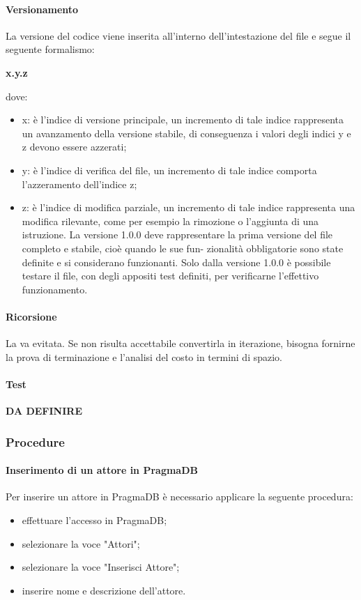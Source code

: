  \paragraph{Versionamento}
 La versione del codice viene inserita all’interno dell’intestazione del file e segue il seguente formalismo:\\
 \centerline{\textbf{x.y.z}} dove:
  \begin{itemize}
 	\item x: è l’indice di versione principale, un incremento di tale indice rappresenta un avanzamento
 	della versione stabile, di conseguenza i valori degli indici y e z devono essere azzerati;
 	\item y: è l’indice di verifica del file, un incremento di tale indice comporta l’azzeramento
 	dell’indice z;
 	\item z: è l’indice di modifica parziale, un incremento di tale indice rappresenta una modifica
 	rilevante, come per esempio la rimozione o l’aggiunta di una istruzione. La versione 1.0.0
 	deve rappresentare la prima versione del file completo e stabile, cioè quando le sue fun-
 	zionalità obbligatorie sono state definite e si considerano funzionanti. Solo dalla versione
 	1.0.0 è possibile testare il file, con degli appositi test definiti, per verificarne l’effettivo
 	funzionamento.
 \end{itemize}
 \paragraph{Ricorsione}
 La  va evitata. Se non risulta accettabile convertirla in iterazione, bisogna fornirne la prova di terminazione e l'analisi del costo in termini di spazio.
 \paragraph{Test} \textbf{DA DEFINIRE}
 \subsubsection{Procedure}
 \paragraph{Inserimento di un attore in PragmaDB}
 Per inserire un attore in PragmaDB è necessario applicare la seguente procedura:
 \begin{itemize}
 	\item effettuare l'accesso in PragmaDB;
 	\item selezionare la voce "Attori";
 	\item selezionare la voce "Inserisci Attore";
 	\item inserire nome e descrizione dell'attore.
 \end{itemize}
